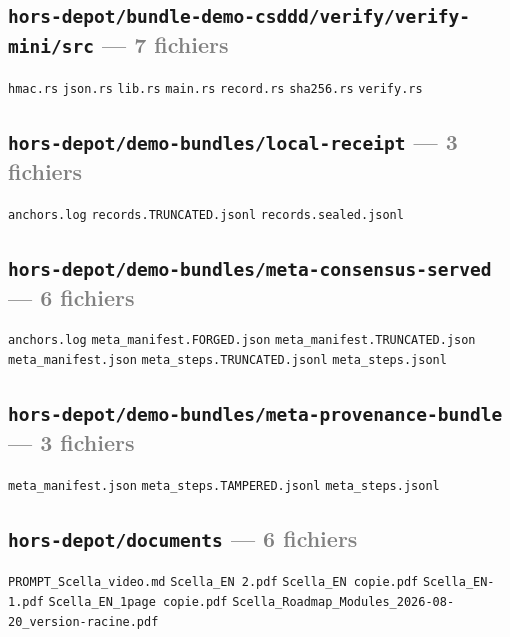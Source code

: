 \documentclass[10pt]{report}
\newcommand{\code}[1]{\texttt{\small #1}}
\begin{document}
\subsection*{\code{hors-depot/bundle-demo-csddd/verify/verify-mini/src} \normalfont\textcolor{grey}{--- 7 fichiers}}
\begin{sloppypar}\footnotesize\raggedright
\code{hmac.rs} \;\textbullet\; \code{json.rs} \;\textbullet\; \code{lib.rs} \;\textbullet\; \code{main.rs} \;\textbullet\; \code{record.rs} \;\textbullet\; \code{sha256.rs} \;\textbullet\; \code{verify.rs}
\end{sloppypar}

\subsection*{\code{hors-depot/demo-bundles/local-receipt} \normalfont\textcolor{grey}{--- 3 fichiers}}
\begin{sloppypar}\footnotesize\raggedright
\code{anchors.log} \;\textbullet\; \code{records.TRUNCATED.jsonl} \;\textbullet\; \code{records.sealed.jsonl}
\end{sloppypar}

\subsection*{\code{hors-depot/demo-bundles/meta-consensus-served} \normalfont\textcolor{grey}{--- 6 fichiers}}
\begin{sloppypar}\footnotesize\raggedright
\code{anchors.log} \;\textbullet\; \code{meta\_manifest.FORGED.json} \;\textbullet\; \code{meta\_manifest.TRUNCATED.json} \;\textbullet\; \code{meta\_manifest.json} \;\textbullet\; \code{meta\_steps.TRUNCATED.jsonl} \;\textbullet\; \code{meta\_steps.jsonl}
\end{sloppypar}

\subsection*{\code{hors-depot/demo-bundles/meta-provenance-bundle} \normalfont\textcolor{grey}{--- 3 fichiers}}
\begin{sloppypar}\footnotesize\raggedright
\code{meta\_manifest.json} \;\textbullet\; \code{meta\_steps.TAMPERED.jsonl} \;\textbullet\; \code{meta\_steps.jsonl}
\end{sloppypar}

\subsection*{\code{hors-depot/documents} \normalfont\textcolor{grey}{--- 6 fichiers}}
\begin{sloppypar}\footnotesize\raggedright
\code{PROMPT\_Scella\_video.md} \;\textbullet\; \code{Scella\_EN 2.pdf} \;\textbullet\; \code{Scella\_EN copie.pdf} \;\textbullet\; \code{Scella\_EN-1.pdf} \;\textbullet\; \code{Scella\_EN\_1page copie.pdf} \;\textbullet\; \code{Scella\_Roadmap\_Modules\_2026-08-20\_version-racine.pdf}
\end{sloppypar}
\end{document}
